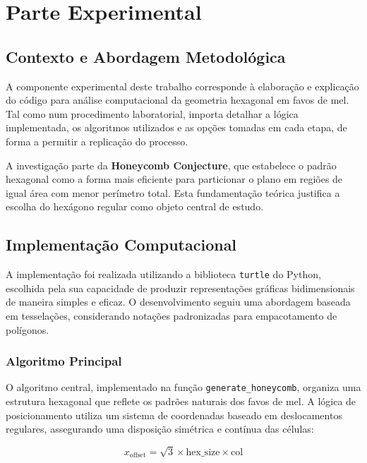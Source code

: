 \documentclass[12pt,a4paper,oneside]{extarticle}
\begin{document}
\section{Parte Experimental}

\subsection{Contexto e Abordagem Metodológica}

A componente experimental deste trabalho corresponde à elaboração e explicação do código para análise computacional da geometria hexagonal em favos de mel. Tal como num procedimento laboratorial, importa detalhar a lógica implementada, os algoritmos utilizados e as opções tomadas em cada etapa, de forma a permitir a replicação do processo.

A investigação parte da \textbf{Honeycomb Conjecture}, que estabelece o padrão hexagonal como a forma mais eficiente para particionar o plano em regiões de igual área com menor perímetro total. Esta fundamentação teórica justifica a escolha do hexágono regular como objeto central de estudo.

\subsection{Implementação Computacional}

A implementação foi realizada utilizando a biblioteca \texttt{turtle} do Python, escolhida pela sua capacidade de produzir representações gráficas bidimensionais de maneira simples e eficaz. O desenvolvimento seguiu uma abordagem baseada em tesselações, considerando notações padronizadas para empacotamento de polígonos.

\subsubsection{Algoritmo Principal}

O algoritmo central, implementado na função \texttt{generate\_honeycomb}, organiza uma estrutura hexagonal que reflete os padrões naturais dos favos de mel. A lógica de posicionamento utiliza um sistema de coordenadas baseado em deslocamentos regulares, assegurando uma disposição simétrica e contínua das células:

\begin{equation}
x_{\text{offset}} = \sqrt{3} \times \text{hex\_size} \times \text{col}
\end{equation}
\end{document}
